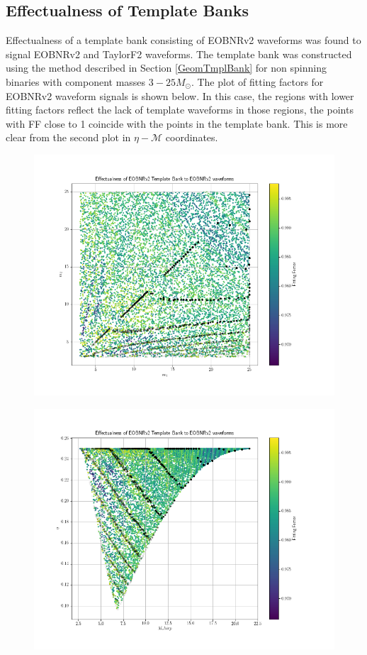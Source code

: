 \documentclass{article}
\begin{document}
\subsection{Effectualness of Template Banks}
Effectualness of a template bank consisting of EOBNRv2 waveforms was found to signal EOBNRv2 and TaylorF2 waveforms. The template bank was constructed using the method described in Section \ref{GeomTmplBank} for non spinning binaries with component masses $3-25 M_{\odot}$. The plot of fitting factors for EOBNRv2 waveform signals is shown below. In this case, the regions with lower fitting factors reflect the lack of template waveforms in those regions, the points with FF close to 1 coincide with the points in the template bank. This is more clear from the second plot in $\eta-\mathcal{M}$ coordinates. 
\begin{figure}[h]
    \begin{minipage}{0.5\textwidth}
        \includegraphics[scale=0.3]{EffectualnessEOBNRv2.png}
        \label{fig:effectualnessEOBm1m2}
    \end{minipage}
    \begin{minipage}{0.5\textwidth}
        \includegraphics[scale=0.3]{EffectualnessEOBNRv2-eta-mchirp-coords.png}

\end{minipage}
\end{figure}
\end{document}
